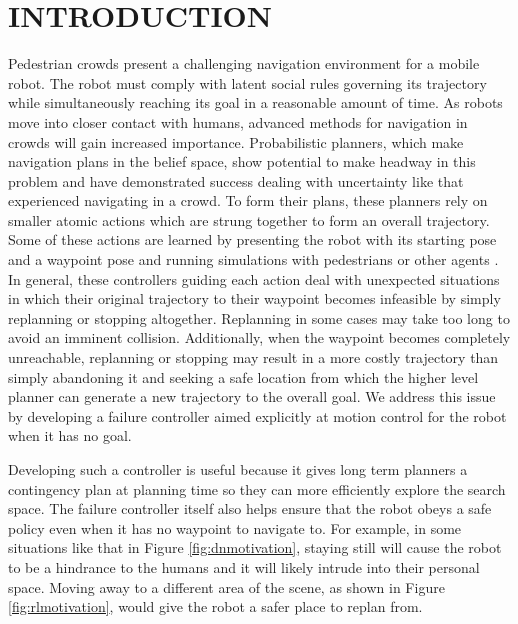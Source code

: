 \documentclass[letterpaper, 10 pt, conference]{ieeeconf}  %
\begin{document}
\section{INTRODUCTION}
	Pedestrian crowds present a challenging navigation environment for a mobile robot. The robot must comply with latent social rules governing its trajectory while simultaneously reaching its goal in a reasonable amount of time. As robots move into closer contact with humans, advanced methods for navigation in crowds will gain increased importance. Probabilistic planners, which make navigation plans in the belief space, show potential to make headway in this problem and have demonstrated success dealing with uncertainty \cite{ppcp} like that experienced navigating in a crowd. To form their plans, these planners rely on smaller atomic actions which are strung together to form an overall trajectory. Some of these actions are learned by presenting the robot with its starting pose and a waypoint pose and running simulations with pedestrians or other agents \cite{crowdawarerl}. In general, these controllers guiding each action deal with unexpected situations in which their original trajectory to their waypoint becomes infeasible by simply replanning or stopping altogether. Replanning in some cases may take too long to avoid an imminent collision. Additionally, when the waypoint becomes completely unreachable, replanning or stopping may result in a more costly trajectory than simply abandoning it and seeking a safe location from which the higher level planner can generate a new trajectory to the overall goal. We address this issue by developing a failure controller aimed explicitly at motion control for the robot when it has no goal.
	
	Developing such a controller is useful because it gives long term planners a contingency plan at planning time so they can more efficiently explore the search space. The failure controller itself also helps ensure that the robot obeys a safe policy even when it has no waypoint to navigate to. For example, in some situations like that in Figure \ref{fig:dnmotivation}, staying still will cause the robot to be a hindrance to the humans and it will likely intrude into their personal space. Moving away to a different area of the scene, as shown in Figure \ref{fig:rlmotivation}, would give the robot a safer place to replan from.
	
\end{document}
